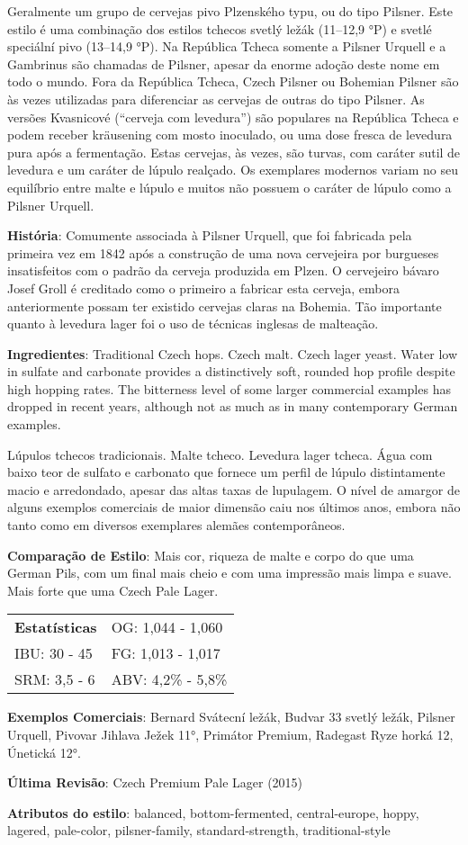 Geralmente um grupo de cervejas pivo Plzenského typu, ou do tipo Pilsner. Este estilo é uma combinação dos estilos tchecos svetlý ležák (11–12,9 °P) e svetlé speciální pivo (13–14,9 °P). Na República Tcheca somente a Pilsner Urquell e a Gambrinus são chamadas de Pilsner, apesar da enorme adoção deste nome em todo o mundo. Fora da República Tcheca, Czech Pilsner ou Bohemian Pilsner são às vezes utilizadas para diferenciar as cervejas de outras do tipo Pilsner. As versões Kvasnicové (“cerveja com levedura”) são populares na República Tcheca e podem receber kräusening com mosto inoculado, ou uma dose fresca de levedura pura após a fermentação. Estas cervejas, às vezes, são turvas, com caráter sutil de levedura e um caráter de lúpulo realçado. Os exemplares modernos variam no seu equilíbrio entre malte e lúpulo e muitos não possuem o caráter de lúpulo como a Pilsner Urquell.

\textbf{História}: Comumente associada à Pilsner Urquell, que foi fabricada pela primeira vez em 1842 após a construção de uma nova cervejeira por burgueses insatisfeitos com o padrão da cerveja produzida em Plzen. O cervejeiro bávaro Josef Groll é creditado como o primeiro a fabricar esta cerveja, embora anteriormente possam ter existido cervejas claras na Bohemia. Tão importante quanto à levedura lager foi o uso de técnicas inglesas de malteação.

\textbf{Ingredientes}: Traditional Czech hops. Czech malt. Czech lager yeast. Water low in sulfate and carbonate provides a distinctively soft, rounded hop profile despite high hopping rates. The bitterness level of some larger commercial examples has dropped in recent years, although not as much as in many contemporary German examples.

Lúpulos tchecos tradicionais. Malte tcheco. Levedura lager tcheca. Água com baixo teor de sulfato e carbonato que fornece um perfil de lúpulo distintamente macio e arredondado, apesar das altas taxas de lupulagem. O nível de amargor de alguns exemplos comerciais de maior dimensão caiu nos últimos anos, embora não tanto como em diversos exemplares alemães contemporâneos.

\textbf{Comparação de Estilo}: Mais cor, riqueza de malte e corpo do que uma German Pils, com um final mais cheio e com uma impressão mais limpa e suave. Mais forte que uma Czech Pale Lager.

\begin{tabular}{@{}p{35mm}p{35mm}@{}}
  \textbf{Estatísticas} & OG: 1,044 - 1,060 \\
  IBU: 30 - 45  & FG: 1,013 - 1,017  \\
  SRM: 3,5 - 6  & ABV: 4,2\% - 5,8\%
\end{tabular}

\textbf{Exemplos Comerciais}: Bernard Svátecní ležák, Budvar 33 svetlý ležák, Pilsner Urquell, Pivovar Jihlava Ježek 11°, Primátor Premium, Radegast Ryze horká 12, Únetická 12°.

\textbf{Última Revisão}: Czech Premium Pale Lager (2015)

\textbf{Atributos do estilo}: balanced, bottom-fermented, central-europe, hoppy, lagered, pale-color, pilsner-family, standard-strength, traditional-style
